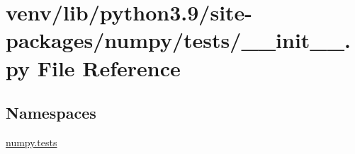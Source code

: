 \hypertarget{venv_2lib_2python3_89_2site-packages_2numpy_2tests_2____init_____8py}{}\section{venv/lib/python3.9/site-\/packages/numpy/tests/\+\_\+\+\_\+init\+\_\+\+\_\+.py File Reference}
\label{venv_2lib_2python3_89_2site-packages_2numpy_2tests_2____init_____8py}
\subsection*{Namespaces}
\begin{DoxyCompactItemize}
\item 
 \hyperlink{namespacenumpy_1_1tests}{numpy.\+tests}
\end{DoxyCompactItemize}
